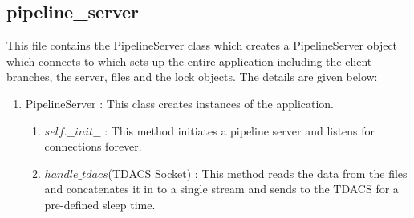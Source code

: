 \subsection{pipeline\_server}
This file contains the PipelineServer class which creates a PipelineServer
object which connects to which sets up the entire application including the
client branches, the server, files and the lock objects. The details are given
below:
\begin{enumerate}
	\item PipelineServer : This class creates instances of the application.
		\begin{enumerate}
		\item $self.\_\_init\_\_$ : This method initiates a pipeline server and
			listens for connections forever.
		\item $handle\_tdacs$(TDACS Socket) : This method reads the data from
			the files and concatenates it in to a single stream and sends to the
			TDACS for a pre-defined sleep time.
		\end{enumerate}
\end{enumerate}

